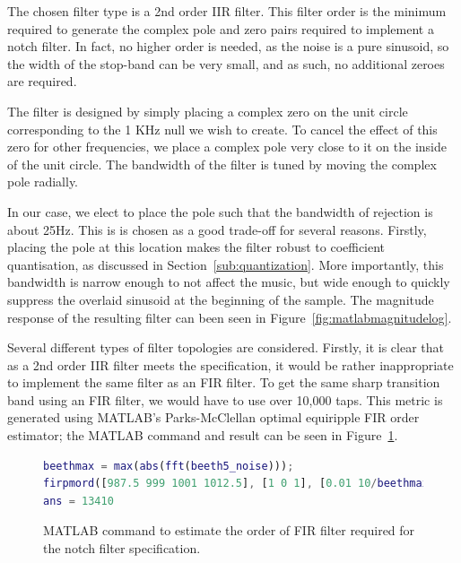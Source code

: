 \documentclass[]{article}
\begin{document}
The chosen filter type is a 2nd order IIR filter. This filter order is the minimum required to generate the complex pole and zero pairs required to implement a notch filter. In fact, no higher order is needed, as the noise is a pure sinusoid, so the width of the stop-band can be very small, and as such, no additional zeroes are required.

The filter is designed by simply placing a complex zero on the unit circle corresponding to the 1 KHz null we wish to create. To cancel the effect of this zero for other frequencies, we place a complex pole very close to it on the inside of the unit circle. The bandwidth of the filter is tuned by moving the complex pole radially.

In our case, we elect to place the pole such that the bandwidth of rejection is about 25Hz. This is is chosen as a good trade-off for several reasons. Firstly, placing the pole at this location makes the filter robust to coefficient quantisation, as discussed in Section~\ref{sub:quantization}.
More importantly, this bandwidth is narrow enough to not affect the music, but wide enough to quickly suppress the overlaid sinusoid at the beginning of the sample.
The magnitude response of the resulting filter can been seen in Figure~\ref{fig:matlabmagnitudelog}.

Several different types of filter topologies are considered. Firstly, it is clear that as a 2nd order IIR filter meets the specification, it would be rather inappropriate to implement the same filter as an FIR filter. To get the same sharp transition band using an FIR filter, we would have to use over 10,000 taps.
This metric is generated using MATLAB's Parks-McClellan optimal equiripple FIR order estimator; the MATLAB command and result can be seen in Figure~\ref{fig:firpmord}.

\begin{figure}[bp]
	\begin{center}
		\begin{lstlisting}[language = Matlab]
beethmax = max(abs(fft(beeth5_noise)));
firpmord([987.5 999 1001 1012.5], [1 0 1], [0.01 10/beethmax 0.01], 44100)
ans = 13410
		\end{lstlisting}
	\end{center}
	\caption{MATLAB command to estimate the order of FIR filter required for the notch filter specification.}
	\label{fig:firpmord}
\end{figure}
\end{document}
